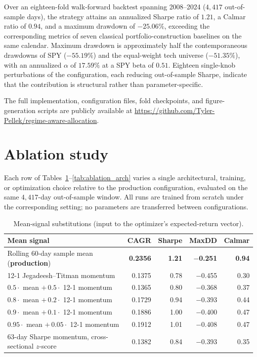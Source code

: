\documentclass[11pt]{article}
\begin{document}
Over an eighteen-fold walk-forward backtest spanning 2008--2024
($4{,}417$ out-of-sample days), the strategy attains an annualized
Sharpe ratio of $1.21$, a Calmar ratio of $0.94$, and a maximum
drawdown of $-25.06\%$, exceeding the corresponding metrics of seven
classical portfolio-construction baselines on the same calendar.
Maximum drawdown is approximately half the contemporaneous drawdowns
of SPY ($-55.19\%$) and the equal-weight tech universe ($-51.35\%$),
with an annualized $\alpha$ of $17.59\%$ at a SPY beta of $0.51$.
Eighteen single-knob perturbations of the configuration, each reducing
out-of-sample Sharpe, indicate that the contribution is structural
rather than parameter-specific.

The full implementation, configuration files, fold checkpoints, and
figure-generation scripts are publicly available at
\url{https://github.com/Tyler-Pellek/regime-aware-allocation}.

\appendix

\section{Ablation study}\label{app:ablation}

Each row of Tables~\ref{tab:ablation_signal}--\ref{tab:ablation_arch}
varies a single architectural, training, or optimization choice
relative to the production configuration, evaluated on the same
$4{,}417$-day out-of-sample window. All runs are trained from scratch
under the corresponding setting; no parameters are transferred between
configurations.

\begin{table}[h]
\centering
\caption{Mean-signal substitutions (input to the optimizer's
expected-return vector).}
\label{tab:ablation_signal}
\small
\begin{tabular}{lrrrr}
\toprule
Mean signal & CAGR & Sharpe & MaxDD & Calmar \\
\midrule
Rolling 60-day sample mean (\textbf{production})    & \textbf{0.2356} & \textbf{1.21} & \textbf{$-$0.251} & \textbf{0.94} \\
12-1 Jegadeesh--Titman momentum                    & 0.1375 & 0.78 & $-$0.455 & 0.30 \\
$0.5\cdot$ mean $+\, 0.5\cdot$ 12-1 momentum       & 0.1365 & 0.80 & $-$0.368 & 0.37 \\
$0.8\cdot$ mean $+\, 0.2\cdot$ 12-1 momentum       & 0.1729 & 0.94 & $-$0.393 & 0.44 \\
$0.9\cdot$ mean $+\, 0.1\cdot$ 12-1 momentum       & 0.1886 & 1.00 & $-$0.400 & 0.47 \\
$0.95\cdot$ mean $+\, 0.05\cdot$ 12-1 momentum     & 0.1912 & 1.01 & $-$0.408 & 0.47 \\
63-day Sharpe momentum, cross-sectional $z$-score  & 0.1382 & 0.84 & $-$0.393 & 0.35 \\
\bottomrule
\end{tabular}
\end{table}
\end{document}
